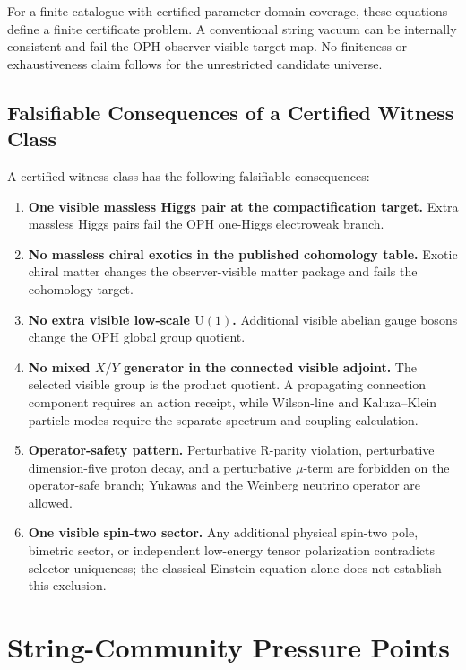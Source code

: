 \documentclass[11pt]{article}
\theoremstyle{remark}
\theoremstyle{plain}
\newcommand{\U}{\mathrm{U}}
\begin{document}
For a finite catalogue with certified parameter-domain coverage, these equations define a finite
certificate problem. A conventional string vacuum can be internally consistent and fail the OPH
observer-visible target map. No finiteness or exhaustiveness claim follows for the unrestricted
candidate universe.

\subsection{Falsifiable Consequences of a Certified Witness Class}

A certified witness class has the following falsifiable consequences:
\begin{enumerate}[leftmargin=2em]
\item \textbf{One visible massless Higgs pair at the compactification target.} Extra massless Higgs pairs fail
the OPH one-Higgs electroweak branch.
\item \textbf{No massless chiral exotics in the published cohomology table.} Exotic chiral matter changes the observer-visible matter
package and fails the cohomology target.
\item \textbf{No extra visible low-scale \(\U(1)\).} Additional visible abelian gauge bosons change
the OPH global group quotient.
\item \textbf{No mixed \(X/Y\) generator in the connected visible adjoint.} The selected visible
group is the product quotient. A propagating connection component requires an action receipt, while
Wilson-line and Kaluza--Klein particle modes require the separate spectrum and coupling calculation.
\item \textbf{Operator-safety pattern.} Perturbative R-parity violation, perturbative
dimension-five proton decay, and a perturbative \(\mu\)-term are forbidden on the operator-safe
branch; Yukawas and the Weinberg neutrino operator are allowed.
\item \textbf{One visible spin-two sector.} Any additional physical spin-two pole, bimetric sector,
or independent low-energy tensor polarization contradicts selector uniqueness; the
classical Einstein equation alone does not establish this exclusion.
\end{enumerate}

\section{String-Community Pressure Points}
\end{document}
